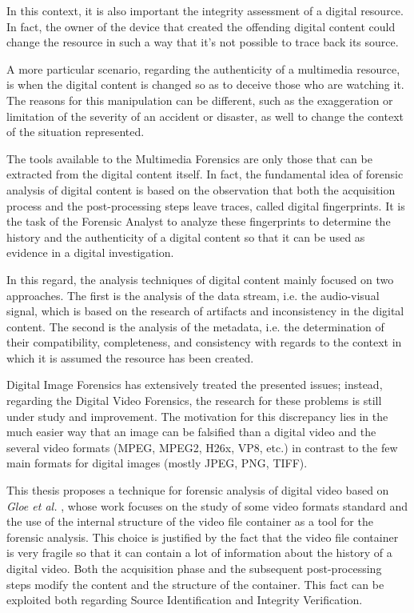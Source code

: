 In this context, it is also important the integrity assessment of a digital resource. In fact, the owner of the device that created the offending digital content could change the resource in such a way that it's not possible to trace back its source.

A more particular scenario, regarding the authenticity of a multimedia resource, is when the digital content is changed so as to deceive those who are watching it. The reasons for this manipulation can be different, such as the exaggeration or limitation of the severity of an accident or disaster, as well to change the context of the situation represented.

The tools available to the Multimedia Forensics are only those that can be extracted from the digital content itself. In fact, the fundamental idea of forensic analysis of digital content is based on the observation that both the acquisition process and the post-processing steps leave traces, called digital fingerprints. It is the task of the Forensic Analyst to analyze these fingerprints to determine the history and the authenticity of a digital content so that it can be used as evidence in a digital investigation.

In this regard, the analysis techniques of digital content mainly focused on two approaches. The first is the analysis of the data stream, i.e. the audio-visual signal, which is based on the research of artifacts and inconsistency in the digital content. The second is the analysis of the metadata, i.e. the determination of their compatibility, completeness, and consistency \cite{Piva} with regards to the context in which it is assumed the resource has been created.

Digital Image Forensics has extensively treated the presented issues; instead, regarding the Digital Video Forensics, the research for these problems is still under study and improvement. The motivation for this discrepancy lies in the much easier way that an image can be falsified than a digital video and the several video formats (MPEG, MPEG2, H26x, VP8, etc.) in contrast to the few main formats for digital images (mostly JPEG, PNG, TIFF).

This thesis proposes a technique for forensic analysis of digital video based on \emph{Gloe et al.} \cite{Gloe2014S68}, whose work focuses on the study of some video formats standard and the use of the internal structure of the video file container as a tool for the forensic analysis. This choice is justified by the fact that the video file container is very fragile so that it can contain a lot of information about the history of a digital video. Both the acquisition phase and the subsequent post-processing steps modify the content and the structure of the container. This fact can be exploited both regarding Source Identification and Integrity Verification.

